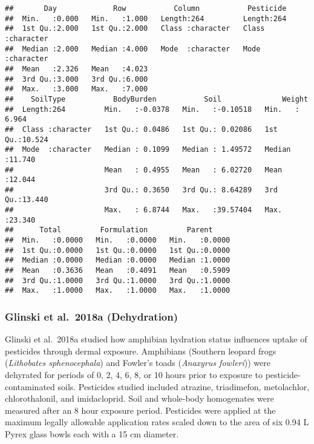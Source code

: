 \documentclass[
]{article}
\begin{document}
\begin{verbatim}
##       Day             Row           Column           Pesticide        
##  Min.   :0.000   Min.   :1.000   Length:264         Length:264        
##  1st Qu.:2.000   1st Qu.:2.000   Class :character   Class :character  
##  Median :2.000   Median :4.000   Mode  :character   Mode  :character  
##  Mean   :2.326   Mean   :4.023                                        
##  3rd Qu.:3.000   3rd Qu.:6.000                                        
##  Max.   :3.000   Max.   :7.000                                        
##    SoilType           BodyBurden           Soil              Weight      
##  Length:264         Min.   :-0.0378   Min.   :-0.10518   Min.   : 6.964  
##  Class :character   1st Qu.: 0.0486   1st Qu.: 0.02086   1st Qu.:10.524  
##  Mode  :character   Median : 0.1099   Median : 1.49572   Median :11.740  
##                     Mean   : 0.4955   Mean   : 6.02720   Mean   :12.044  
##                     3rd Qu.: 0.3650   3rd Qu.: 8.64289   3rd Qu.:13.440  
##                     Max.   : 6.8744   Max.   :39.57404   Max.   :23.340  
##      Total         Formulation         Parent      
##  Min.   :0.0000   Min.   :0.0000   Min.   :0.0000  
##  1st Qu.:0.0000   1st Qu.:0.0000   1st Qu.:0.0000  
##  Median :0.0000   Median :0.0000   Median :1.0000  
##  Mean   :0.3636   Mean   :0.4091   Mean   :0.5909  
##  3rd Qu.:1.0000   3rd Qu.:1.0000   3rd Qu.:1.0000  
##  Max.   :1.0000   Max.   :1.0000   Max.   :1.0000
\end{verbatim}

\hypertarget{glinski-et-al.-2018a-dehydration}{%
\subsubsection{Glinski et al.~2018a
(Dehydration)}\label{glinski-et-al.-2018a-dehydration}}

Glinski et al.~2018a studied how amphibian hydration status influences
uptake of pesticides through dermal exposure. Amphibians (Southern
leopard frogs (\emph{Lithobates sphenocephala}) and Fowler's toads
(\emph{Anaxyrus fowleri})) were dehyrated for periods of 0, 2, 4, 6, 8,
or 10 hours prior to exposure to pesticide-contaminated soils.
Pesticides studied included atrazine, triadimefon, metolachlor,
chlorothalonil, and imidacloprid. Soil and whole-body homogenates were
measured after an 8 hour exposure period. Pesticides were applied at the
maximum legally allowable application rates scaled down to the area of
six 0.94 L Pyrex glass bowls each with a 15 cm diameter.
\end{document}
